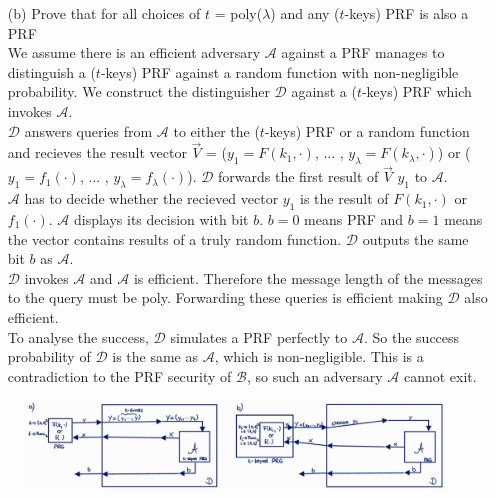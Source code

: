 \begin{itemize}
	
\item [(b)]
	Prove that for all choices of \(t\) = poly(\(\lambda\)) and any (\(t\)-keys) PRF is also a PRF \\
	We assume there is an efficient adversary \(\mathcal{A}\) against a PRF manages to distinguish a (\(t\)-keys) PRF against a random function with non-negligible probability. We construct the distinguisher \(\mathcal{D}\) against a (\(t\)-keys) PRF which invokes \(\mathcal{A}\).\\
	\(\mathcal{D}\) answers queries from \(\mathcal{A}\) to either the (\(t\)-keys) PRF or a random function and recieves the result vector \(\vec{V}\) = (\(y_1 = F(k_1,\cdot)\), ... , \(y_\lambda = F(k_\lambda,\cdot)\)) or (\(y_1 = f_1 (\cdot)\), ... , \(y_\lambda = f_\lambda (\cdot)\)). \(\mathcal{D}\) forwards the first result of \(\vec{V}\) \(y_1\) to \(\mathcal{A}\). \\
	\(\mathcal{A}\) has to decide whether the recieved vector \(y_1\) is the result of \(F(k_1,\cdot)\) or \(f_1(\cdot)\). \(\mathcal{A}\) displays its decision with bit \(b\). \(b = 0\) means PRF and  \(b = 1\) means the vector contains results of a truly random function. \(\mathcal{D}\) outputs the same bit \(b\) as \(\mathcal{A}\). \\
	\(\mathcal{D}\) invokes \(\mathcal{A}\) and \(\mathcal{A}\) is efficient. Therefore the message length of the messages to the query must be poly. Forwarding these queries is efficient making \(\mathcal{D}\) also efficient.  \\
	To analyse the success, \(\mathcal{D}\) simulates a PRF perfectly to \(\mathcal{A}\). So the success probability of \(\mathcal{D}\) is the same as \(\mathcal{A}\), which is non-negligible. This is a contradiction to the PRF security of \(\mathcal{B}\), so such an adversary \(\mathcal{A}\) cannot exit. \\

\end{itemize}

\begin{figure}[h]
    \includegraphics[width=\textwidth,height=\textheight,keepaspectratio]{ModKrypt_9-4.jpg}
    \centering
\end{figure}


